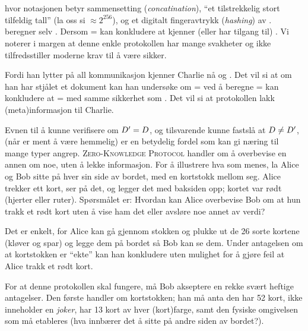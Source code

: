 \documentclass[a4paper, parskip=half]{scrartcl}
\theoremstyle{definition}
\begin{document}
\begin{ASteps}
   \\
   \\
\end{ASteps}
%
hvor notasjonen \AConcat betyr sammensetting
(\textit{concatination}),  ``et tilstrekkelig stort
tilfeldig tall'' (la oss si $\approx2^{256}$), og  et
digitalt fingeravtrykk (\textit{hashing}) av .  
beregner selv .
Dersom = kan  konkludere at  kjenner
(eller har tilgang til) .  Vi noterer i
margen at denne enkle protokollen har mange svakheter og ikke
tilfredsstiller moderne krav til å være sikker.

Fordi han lytter på all kommunikasjon kjenner Charlie nå 
og .  Det vil
si at om han har 
stjålet et dokument  kan han undersøke om = 
ved å beregne
{}
 =  kan  konkludere at = med 
samme sikkerhet som .
Det vil si at protokollen lakk (meta)informasjon til Charlie.

Evnen til å kunne verifisere om $D'=D$, og tilsvarende
kunne fastslå at $D\not=D^\prime$, (når  er
ment å være hemmelig)  er en betydelig fordel som
kan gi næring til mange typer angrep.  \textsc{Zero-Knowledge
  Protocol} handler 
om å overbevise en annen om noe, uten å lekke informasjon.  For å
illustrere hva som menes, la Alice og Bob sitte på hver sin side av
bordet, med en kortstokk mellom seg.  Alice trekker ett kort, ser på
det, og legger det med baksiden opp; kortet var rødt (hjerter eller
ruter).  Spørsmålet er: Hvordan kan Alice overbevise Bob om at hun
trakk et rødt kort uten å vise ham det eller avsløre noe annet av
verdi?

Det er enkelt, for  Alice kan gå gjennom stokken og plukke ut de 26
sorte kortene (kløver og spar) og legge dem på bordet så Bob kan se
dem.  Under antagelsen 
om at kortstokken er ``ekte'' kan han konkludere uten mulighet for å
gjøre feil at Alice trakk et rødt kort.

For at denne protokollen skal fungere, må Bob akseptere en rekke svært
heftige antagelser.  Den første handler om kortstokken; han må anta
den har 52 kort, ikke inneholder en \emph{joker}, har 13 kort av hver
(kort)farge, samt den fysiske omgivelsen som må etableres (hva
innbærer det å sitte på andre siden av bordet?).
\end{document}

